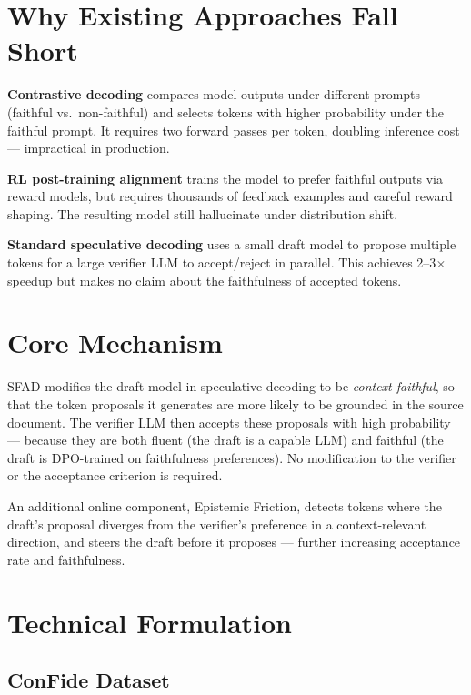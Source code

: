 \documentclass[10pt,twocolumn]{article}
\begin{document}
\section{Why Existing Approaches Fall Short}

\textbf{Contrastive decoding} compares model outputs under different
prompts (faithful vs.\ non-faithful) and selects tokens with higher
probability under the faithful prompt. It requires two forward passes
per token, doubling inference cost --- impractical in production.

\textbf{RL post-training alignment} trains the model to prefer faithful
outputs via reward models, but requires thousands of feedback examples
and careful reward shaping. The resulting model still hallucinate under
distribution shift.

\textbf{Standard speculative decoding} uses a small draft model to
propose multiple tokens for a large verifier LLM to accept/reject in
parallel. This achieves 2--3$\times$ speedup but makes no claim about
the faithfulness of accepted tokens.

\section{Core Mechanism}

SFAD modifies the draft model in speculative decoding to be
\emph{context-faithful}, so that the token proposals it generates are
more likely to be grounded in the source document. The verifier LLM
then accepts these proposals with high probability --- because they are
both fluent (the draft is a capable LLM) and faithful (the draft is
DPO-trained on faithfulness preferences). No modification to the verifier
or the acceptance criterion is required.

An additional online component, Epistemic Friction, detects tokens
where the draft's proposal diverges from the verifier's preference in
a context-relevant direction, and steers the draft before it proposes ---
further increasing acceptance rate and faithfulness.

\section{Technical Formulation}

\subsection{ConFide Dataset}
\end{document}
